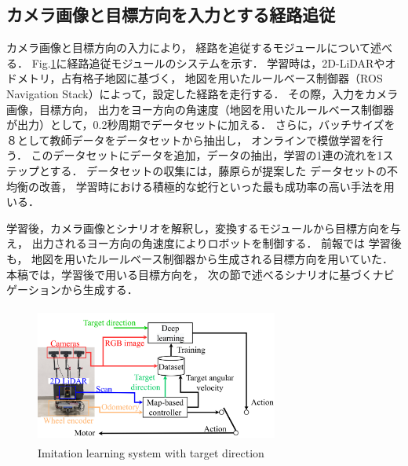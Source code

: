 \documentclass{sice-si}
\begin{document}
\subsection{カメラ画像と目標方向を入力とする経路追従}
カメラ画像と目標方向の入力により，
経路を追従するモジュールについて述べる．
Fig.\ref{fig:learning}に経路追従モジュールのシステムを示す．
学習時は，2D-LiDARやオドメトリ，占有格子地図に基づく，
地図を用いたルールベース制御器（ROS Navigation Stack\cite{ros-navigation}）によって，設定した経路を走行する．
その際，入力をカメラ画像，目標方向，
出力をヨー方向の角速度（地図を用いたルールベース制御器が出力）として，0.2秒周期でデータセットに加える．
さらに，バッチサイズを８として教師データをデータセットから抽出し，
オンラインで模倣学習を行う．
このデータセットにデータを追加，データの抽出，学習の1連の流れを1ステップとする．
データセットの収集には，藤原らが提案した
データセットの不均衡の改善，
学習時における積極的な蛇行といった最も成功率の高い手法を用いる．\par
学習後，カメラ画像とシナリオを解釈し，変換するモジュールから目標方向を与え，
出力されるヨー方向の角速度によりロボットを制御する．
前報では
学習後も，
地図を用いたルールベース制御器から生成される目標方向を用いていた．
本稿では，学習後で用いる目標方向を，
次の節で述べるシナリオに基づくナビゲーションから生成する．
\begin{figure}[h!]
    \centering
     \includegraphics[height=45mm,width=80mm]{./figs/learning_gamma.png}
     \caption{Imitation learning system with target direction}\label{fig:learning}
\end{figure}
\end{document}
